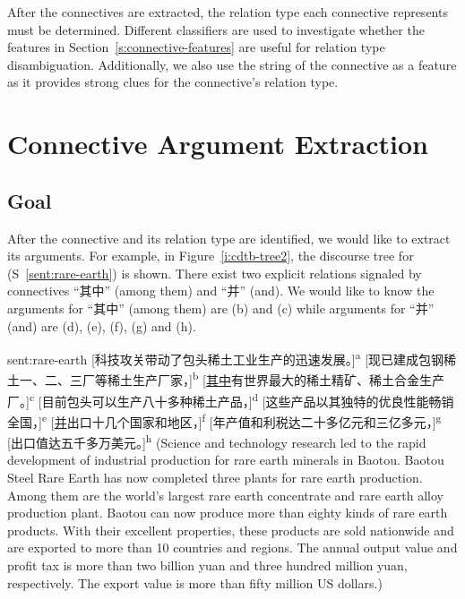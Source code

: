 After the connectives are extracted, the relation type each connective represents
must be determined. Different classifiers are used to investigate whether the features in
Section~\ref{s:connective-features} are useful for relation type disambiguation.
Additionally, we also use the string of the connective as a feature as it provides strong
clues for the connective's relation type.

\section{Connective Argument Extraction}

\subsection{Goal}

After the connective and its relation type are identified, we would like to extract
its arguments. For example, in Figure~\ref{i:cdtb-tree2}, the discourse tree
for (S~\ref{sent:rare-earth}) is shown. There exist two explicit relations signaled by
connectives ``其中'' (among them) and ``并'' (and). We would like to know the
arguments for ``其中'' (among them) are (b) and (c) while arguments for ``并'' (and) are
(d), (e), (f), (g) and (h).



\begin{sent}{sent:rare-earth}{}
    [科技攻关带动了包头稀土工业生产的迅速发展。]\textsuperscript{a}
    [现已建成包钢稀土一、二、三厂等稀土生产厂家，]\textsuperscript{b}
    [\underline{其中}有世界最大的稀土精矿、稀土合金生产厂。]\textsuperscript{c}
    [目前包头可以生产八十多种稀土产品，]\textsuperscript{d}
    [这些产品以其独特的优良性能畅销全国，]\textsuperscript{e}
    [\underline{并}出口十几个国家和地区，]\textsuperscript{f}
    [年产值和利税达二十多亿元和三亿多元，]\textsuperscript{g}
    [出口值达五千多万美元。]\textsuperscript{h}
    (Science and technology research led to the rapid development of industrial production
    for rare earth minerals in Baotou. Baotou Steel Rare Earth has now completed three
    plants for rare earth production. Among them are the world's largest rare earth
    concentrate and rare earth alloy production plant. Baotou can now produce more than
    eighty kinds of rare earth products. With their excellent properties, these products
    are sold nationwide and are exported to more than 10 countries and regions.
    The annual output value and profit tax is more
    than two billion yuan and three hundred million yuan, respectively.
    The export value is more than fifty million US dollars.)
\end{sent}

